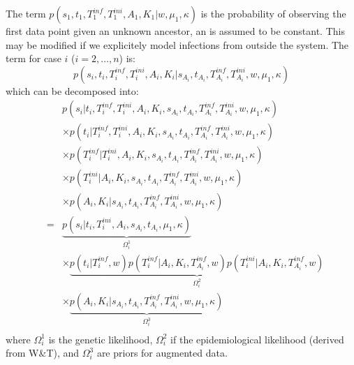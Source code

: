 \documentclass[10pt]{article}
\begin{document}
The term $p(s_1, t_1, T_1^{inf}, T_1^{ini}, A_1, K_1 | w, \mu_1, \kappa)$ is the probability of observing the first data point given an unknown ancestor, an is assumed to be constant.
This may be modified if we explicitely model infections from outside the system.
The term for case $i$ ($i=2,\ldots,n$) is:
\begin{equation}
 p(s_i, t_i, T_i^{inf},T_i^{ini}, A_i, K_i| s_{A_i}, t_{A_i}, T_{A_i}^{inf}, T_{A_i}^{ini}, w, \mu_1, \kappa )
\end{equation}
which can be decomposed into:
\begin{eqnarray}
& & p(s_i | t_i, T_i^{inf}, T_i^{ini}, A_i, K_i, s_{A_i}, t_{A_i}, T_{A_i}^{inf}, T_{A_i}^{ini}, w, \mu_1, \kappa) \nonumber \\
& &  \times  p(t_i | T_i^{inf}, T_i^{ini}, A_i, K_i, s_{A_i}, t_{A_i}, T_{A_i}^{inf}, T_{A_i}^{ini}, w, \mu_1, \kappa) \nonumber \\
& & \times  p(T_i^{inf}| T_i^{ini}, A_i, K_i, s_{A_i}, t_{A_i}, T_{A_i}^{inf}, T_{A_i}^{ini}, w, \mu_1, \kappa) \nonumber \\
& & \times  p(T_i^{ini}| A_i, K_i, s_{A_i}, t_{A_i}, T_{A_i}^{inf}, T_{A_i}^{ini}, w, \mu_1, \kappa) \nonumber \\
& & \times  p(A_i, K_i| s_{A_i}, t_{A_i}, T_{A_i}^{inf}, T_{A_i}^{ini}, w, \mu_1, \kappa) \nonumber \\
& = & 
\underbrace{p(s_i | t_i, T_i^{ini}, A_i, s_{A_i}, t_{A_i}, \mu_1, \kappa)}_{\Omega_i^1} \nonumber \\
& &  \times  \underbrace{p(t_i | T_i^{inf}, w) 
 p(T_i^{inf}| A_i, K_i, T_{A_i}^{inf}, w)
 p(T_i^{ini}| A_i, K_i, T_{A_i}^{inf}, w)}_{\Omega_i^2} \nonumber \\
& & \times  \underbrace{p(A_i, K_i| s_{A_i}, t_{A_i}, T_{A_i}^{inf}, T_{A_i}^{ini}, w, \mu_1, \kappa)}_{\Omega_i^3}\nonumber \\
\end{eqnarray}
\noindent where $\Omega_i^1$ is the genetic likelihood, $\Omega_i^2$ if the epidemiological likelihood (derived from W\&T), and $\Omega_i^3$ are priors for augmented data.
\\
\end{document}

